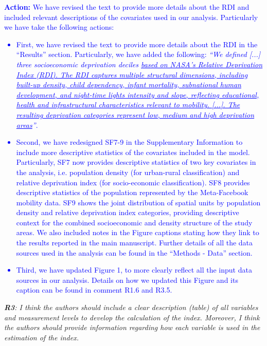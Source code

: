 \documentclass[12pt,a4paper,oneside, reqno]{amsart}
\begin{document}
\textcolor{blue}{
\textbf{Action:} We have revised the text to provide more details about the RDI and included relevant descriptions of the covariates used in our analysis. Particularly we have take the following actions:
\begin{itemize}[noitemsep, topsep=0pt]
    \item First, we have revised the text to provide more details about the RDI in the ``Results'' section. Particularly, we have added the following: \textit{``We defined [...] three socioeconomic deprivation deciles \ul{based on NASA's Relative Deprivation Index (RDI). The RDI captures multiple structural dimensions, including built-up density, child dependency, infant mortality, subnational human development, and night-time lights intensity and slope, reflecting educational, health and infrastructural characteristics relevant to mobility. [...]. The resulting deprivation categories represent low, medium and high deprivation areas}''}.
    \item Second, we have redesigned SF7-9 in the Supplementary Information to include more descriptive statistics of the covariates included in the model. Particularly, SF7 now provides descriptive statistics of two key covariates in the analysis, i.e. population density (for urban-rural classification) and relative deprivation index (for socio-economic classification). SF8 provides descriptive statistics of the population represented by the Meta-Facebook mobility data. SF9 shows the joint distribution of spatial units by population density and relative deprivation index categories, providing descriptive context for the combined socioeconomic and density structure of the study areas. We also included notes in the Figure captions stating how they link to the results reported in the main manuscript. Further details of all the data sources used in the analysis can be found in the ``Methods - Data'' section.
    \item Third, we have updated Figure 1, to more clearly reflect all the input data sources in our analysis. Details on how we updated this Figure and its caption can be found in comment R1.6 and R3.5.
\end{itemize}
}
\setlength{\leftskip}{1cm} \textit{\textbf{R3}: I think the authors should include a clear description (table) of all variables and measurement levels to develop the calculation of the index. Moreover, I think the authors should provide information regarding how each variable is used in the estimation of the index.}
\end{document}
